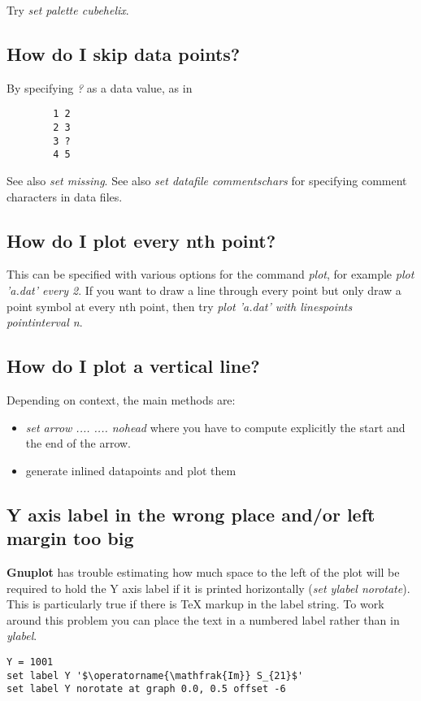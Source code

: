 \documentclass[a4paper,11pt]{article}
\newcommand{\Gnuplot}{\textbf{Gnuplot }}
\begin{document}
Try {\em set palette cubehelix}.

\subsection{How do I skip data points?}

By specifying \textit{?} as a data value, as in
\small
\begin{verbatim}
        1 2
        2 3
        3 ?
        4 5
\end{verbatim}
\normalsize

See also \textit{set missing}.
See also \textit{set datafile commentschars} for specifying comment characters in
data files.


\subsection{How do I plot every nth point?}

This can be specified with various options for the command {\em plot},
for example {\em plot 'a.dat' every 2}.  If you want to draw a line
through every point but only draw a point symbol at every nth point,
then try {\em plot 'a.dat' with linespoints pointinterval n}.


\subsection{How do I plot a vertical line?}

Depending on context, the main methods are:
\begin{itemize}
\item {\em set arrow .... .... nohead} where you have to compute
explicitly the start and the end of the arrow.
\item generate inlined datapoints and plot them
\end{itemize}

\subsection{Y axis label in the wrong place and/or left margin too big}
\Gnuplot has trouble estimating how much space to the left of the plot
will be required to hold the Y axis label if it is printed horizontally
({\em set ylabel norotate}).  This is particularly true if there is
TeX markup in the label string.  To work around this problem you can place
the text in a numbered label rather than in {\em ylabel}.
\small
\begin{verbatim}
Y = 1001
set label Y '$\operatorname{\mathfrak{Im}} S_{21}$'
set label Y norotate at graph 0.0, 0.5 offset -6
\end{verbatim}
\normalsize
\end{document}
